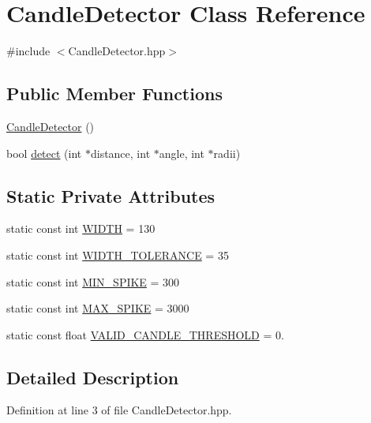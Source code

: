 \hypertarget{classCandleDetector}{\section{Candle\-Detector Class Reference}
\label{classCandleDetector}
}


{\ttfamily \#include $<$Candle\-Detector.\-hpp$>$}

\subsection*{Public Member Functions}
\begin{DoxyCompactItemize}
\item 
\hyperlink{classCandleDetector_ad018cfcc4256482dcc093cca4411fea6}{Candle\-Detector} ()
\item 
bool \hyperlink{classCandleDetector_ae02492f18d3f1ff4282bebb70bfdd905}{detect} (int $\ast$distance, int $\ast$angle, int $\ast$radii)
\end{DoxyCompactItemize}
\subsection*{Static Private Attributes}
\begin{DoxyCompactItemize}
\item 
static const int \hyperlink{classCandleDetector_af4c5d2170cea56fa4263639f20ed13ed}{W\-I\-D\-T\-H} = 130
\item 
static const int \hyperlink{classCandleDetector_a1c8f0232491ba37dd10032c1da376145}{W\-I\-D\-T\-H\-\_\-\-T\-O\-L\-E\-R\-A\-N\-C\-E} = 35
\item 
static const int \hyperlink{classCandleDetector_a9062a3c45b98c5d051082dbf4a285fd5}{M\-I\-N\-\_\-\-S\-P\-I\-K\-E} = 300
\item 
static const int \hyperlink{classCandleDetector_a3903cd4085162f1fc38ca74cac3b954e}{M\-A\-X\-\_\-\-S\-P\-I\-K\-E} = 3000
\item 
static const float \hyperlink{classCandleDetector_ac8aa00d0477ff096c344ec71d8ccdf82}{V\-A\-L\-I\-D\-\_\-\-C\-A\-N\-D\-L\-E\-\_\-\-T\-H\-R\-E\-S\-H\-O\-L\-D} = 0.
\end{DoxyCompactItemize}


\subsection{Detailed Description}


Definition at line 3 of file Candle\-Detector.\-hpp.



